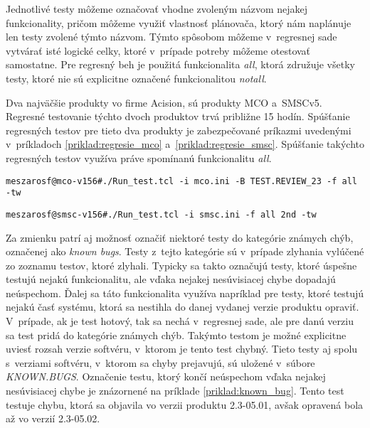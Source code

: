 Jednotlivé testy môžeme označovať vhodne zvoleným názvom nejakej 
funkcionality, pričom môžeme využiť vlastnosť plánovača, ktorý nám 
naplánuje len testy zvolené týmto názvom. Týmto spôsobom môžeme 
v~regresnej sade vytvárať isté logické celky, ktoré v~prípade potreby 
môžeme otestovať samostatne. Pre regresný beh je použitá funkcionalita 
\emph{all}, ktorá združuje všetky testy, ktoré nie sú explicitne označené 
funkcionalitou \emph{notall}. 

Dva najväčšie produkty vo firme Acision, sú produkty MCO a~SMSCv5.
Regresné testovanie týchto dvoch produktov trvá približne 15 hodín.
Spúšťanie regresných testov pre tieto dva produkty 
je zabezpečované príkazmi uvedenými v~príkladoch \ref{priklad:regresie_mco}
a~\ref{priklad:regresie_smsc}. Spúšťanie takýchto regresných testov využíva
práve spomínanú funkcionalitu \emph{all}.

\begin{lstlisting}[caption=Spúšťanie regresných testov v~produkte MCO
,label=priklad:regresie_mco]
meszarosf@mco-v156#./Run_test.tcl -i mco.ini -B TEST.REVIEW_23 -f all -tw
\end{lstlisting}

\begin{lstlisting}[caption=Spúšťanie regresných testov v~produkte SMSCv5
,label=priklad:regresie_smsc]
meszarosf@smsc-v156#./Run_test.tcl -i smsc.ini -f all 2nd -tw
\end{lstlisting}

Za zmienku patrí aj možnosť označiť niektoré testy do kategórie 
známych chýb, označenej ako \emph{known bugs}. 
Testy z~tejto kategórie sú v~prípade zlyhania vylúčené zo zoznamu 
testov, ktoré zlyhali.
Typicky sa takto označujú testy, ktoré úspešne testujú nejakú 
funkcionalitu, ale vďaka nejakej nesúvisiacej chybe 
dopadajú neúspechom. Ďalej sa táto funkcionalita využíva napríklad pre 
testy, ktoré testujú nejakú časť systému, ktorá sa nestihla do danej 
vydanej verzie produktu opraviť. V~prípade, ak je test hotový, tak sa 
nechá v~regresnej sade, ale pre danú verziu sa test pridá do kategórie 
známych chýb.
Takýmto testom je možné explicitne uviesť rozsah verzie softvéru, 
v~ktorom je tento test chybný. Tieto testy aj spolu s~verziami softvéru, 
v~ktorom sa chyby prejavujú, sú uložené v~súbore \emph{KNOWN.BUGS}.
Označenie testu, ktorý končí neúspechom vďaka nejakej 
nesúvisiacej chybe je znázornené na príklade \ref{priklad:known_bug}.
Tento test testuje chybu, ktorá sa objavila vo verzii produktu 2.3-05.01, 
avšak opravená bola až vo verzií 2.3-05.02. 

